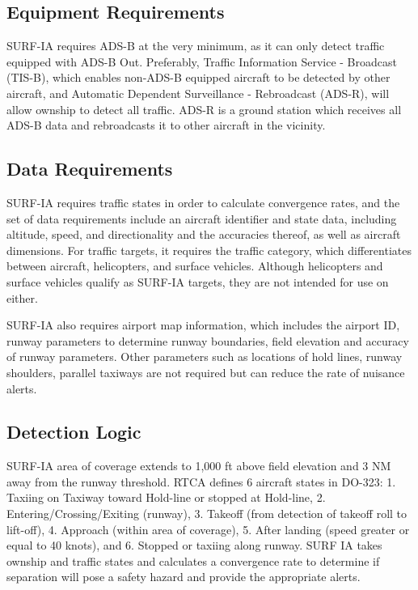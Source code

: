 \subsection{Equipment Requirements}

SURF-IA requires ADS-B at the very minimum, as it can only detect traffic equipped with ADS-B Out. Preferably, Traffic Information Service - Broadcast (TIS-B), which enables non-ADS-B equipped aircraft to be detected by other aircraft, and Automatic Dependent Surveillance - Rebroadcast (ADS-R), will allow ownship to detect all traffic. ADS-R is a ground station which receives all ADS-B data and rebroadcasts it to other aircraft in the vicinity.

\subsection{Data Requirements}

SURF-IA requires traffic states in order to calculate convergence rates, and the set of data requirements include an aircraft identifier and state data, including altitude, speed, and directionality and the accuracies thereof, as well as aircraft dimensions. For traffic targets, it requires the traffic category, which differentiates between aircraft, helicopters, and surface vehicles. Although helicopters and surface vehicles qualify as SURF-IA targets, they are not intended for use on either.

SURF-IA also requires airport map information, which includes the airport ID, runway parameters to determine runway boundaries, field elevation and accuracy of runway parameters. Other parameters such as locations of hold lines, runway shoulders, parallel taxiways are not required but can reduce the rate of nuisance alerts.

\subsection{Detection Logic}

SURF-IA area of coverage extends to 1,000 ft above field elevation and 3 NM away from the runway threshold. RTCA defines 6 aircraft states in DO-323: 1. Taxiing on Taxiway toward Hold-line or stopped at Hold-line, 2. Entering/Crossing/Exiting (runway), 3. Takeoff (from detection of takeoff roll to lift-off), 4. Approach (within area of coverage), 5.  After landing (speed greater or equal to 40 knots), and 6. Stopped or taxiing along runway. SURF IA takes ownship and traffic states and calculates a convergence rate to determine if separation will pose a safety hazard and provide the appropriate alerts.  

